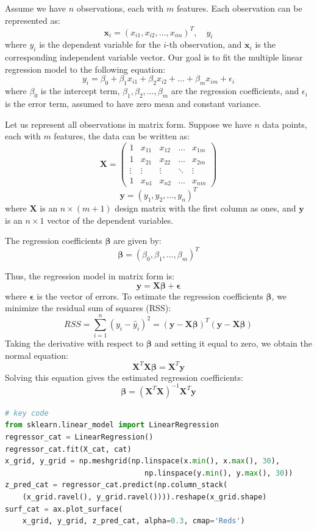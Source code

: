 \documentclass[withoutpreface,bwprint]{cumcmthesis} %
\begin{document}
\begin{solution}
Assume we have $n$ observations, each with $m$ features. Each observation can be represented as:
\[
\mathbf{x}_i = (x_{i1}, x_{i2}, \dots, x_{im})^T, \quad y_i
\]
where $y_i$ is the dependent variable for the $i$-th observation, and $\mathbf{x}_i$ is the corresponding independent variable vector. Our goal is to fit the multiple linear regression model to the following equation:
\[
y_i = \beta_0 + \beta_1 x_{i1} + \beta_2 x_{i2} + \dots + \beta_m x_{im} + \epsilon_i
\]
where $\beta_0$ is the intercept term, $\beta_1, \beta_2, \dots, \beta_m$ are the regression coefficients, and $\epsilon_i$ is the error term, assumed to have zero mean and constant variance.


Let us represent all observations in matrix form. Suppose we have $n$ data points, each with $m$ features, the data can be written as:
\[
\mathbf{X} = \begin{pmatrix}
1 & x_{11} & x_{12} & \dots & x_{1m} \\
1 & x_{21} & x_{22} & \dots & x_{2m} \\
\vdots & \vdots & \vdots & \ddots & \vdots \\
1 & x_{n1} & x_{n2} & \dots & x_{nm}
\end{pmatrix}
\]
\[
\mathbf{y} = (y_1, y_2, \dots, y_n)^T
\]
where $\mathbf{X}$ is an $n \times (m+1)$ design matrix with the first column as ones, and $\mathbf{y}$ is an $n \times 1$ vector of the dependent variables.

The regression coefficients $\boldsymbol{\beta}$ are given by:
\[
\boldsymbol{\beta} = (\beta_0, \beta_1, \dots, \beta_m)^T
\]

Thus, the regression model in matrix form is:
\[
\mathbf{y} = \mathbf{X} \boldsymbol{\beta} + \boldsymbol{\epsilon}
\]
where $\boldsymbol{\epsilon}$ is the vector of errors.
To estimate the regression coefficients $\boldsymbol{\beta}$, we minimize the residual sum of squares (RSS):
\[
RSS = \sum_{i=1}^{n} (y_i - \hat{y}_i)^2 = (\mathbf{y} - \mathbf{X} \boldsymbol{\beta})^T (\mathbf{y} - \mathbf{X} \boldsymbol{\beta})
\]
Taking the derivative with respect to $\boldsymbol{\beta}$ and setting it equal to zero, we obtain the normal equation:
\[
\mathbf{X}^T \mathbf{X} \boldsymbol{\beta} = \mathbf{X}^T \mathbf{y}
\]
Solving this equation gives the estimated regression coefficients:
\[
\boldsymbol{\beta} = (\mathbf{X}^T \mathbf{X})^{-1} \mathbf{X}^T \mathbf{y}
\]
\end{solution}
\begin{lstlisting}[language=python]
# key code
from sklearn.linear_model import LinearRegression
regressor_cat = LinearRegression()
regressor_cat.fit(X_cat, cat)
x_grid, y_grid = np.meshgrid(np.linspace(x.min(), x.max(), 30),
                                np.linspace(y.min(), y.max(), 30))
z_pred_cat = regressor_cat.predict(np.column_stack(
    (x_grid.ravel(), y_grid.ravel()))).reshape(x_grid.shape)
surf_cat = ax.plot_surface(
    x_grid, y_grid, z_pred_cat, alpha=0.3, cmap='Reds')
\end{lstlisting}
\end{document}

